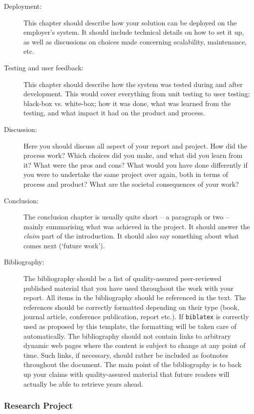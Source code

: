 \begin{description}
    \item[Deployment:] This chapter should describe how your solution can be deployed on the employer's system. It should include technical details on how to set it up, as well as discussions on choices made concerning scalability, maintenance, etc.
    \item[Testing and user feedback:] This chapter should describe how the system was tested during and after development. This would cover everything from unit testing to user testing; black-box vs. white-box; how it was done, what was learned from the testing, and what impact it had on the product and process.
    \item[Discussion:] Here you should discuss all aspect of your report and project. How did the process work? Which choices did you make, and what did you learn from it? What were the pros and cons? What would you have done differently if you were to undertake the same project over again, both in terms of process and product? What are the societal consequences of your work?
    \item[Conclusion:] The conclusion chapter is usually quite short – a paragraph or two – mainly summarising what was achieved in the project. It should answer the \emph{claim} part of the introduction. It should also say something about what comes next (`future work').
    \item[Bibliography:] The bibliography should be a list of quality-assured peer-reviewed published material that you have used throughout the work with your report. All items in the bibliography should be referenced in the text. The references should be correctly formatted depending on their type (book, journal article, conference publication, report etc.). If \texttt{biblatex} is correctly used as proposed by this template, the formatting will be taken care of automatically. The bibliography should not contain links to arbitrary dynamic web pages where the content is subject to change at any point of time. Such links, if necessary, should rather be included as footnotes throughout the document. The main point of the bibliography is to back up your claims with quality-assured material that future readers will actually be able to retrieve years ahead.
\end{description}

\subsubsection{Research Project}
\label{sec:resesarch}

